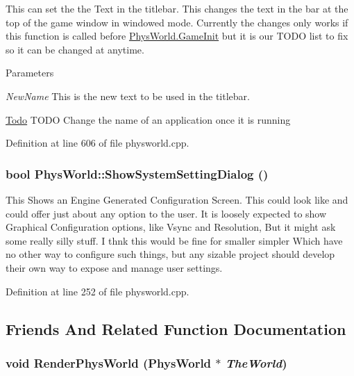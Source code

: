 This can set the the Text in the titlebar. This changes the text in the bar at the top of the game window in windowed mode. Currently the changes only works if this function is called before \hyperlink{classPhysWorld_afc5116f97cc1e91e899d1a1ca7e14e9b}{PhysWorld.GameInit} but it is our TODO list to fix so it can be changed at anytime. 
\begin{DoxyParams}{Parameters}
\item[{\em NewName}]This is the new text to be used in the titlebar. \end{DoxyParams}


\begin{Desc}
\item[\hyperlink{todo__todo000010}{Todo}]TODO Change the name of an application once it is running \end{Desc}


Definition at line 606 of file physworld.cpp.\hypertarget{classPhysWorld_a9b83f04907443c6307956a3c4089e3ca}{
\subsubsection[{ShowSystemSettingDialog}]{\setlength{\rightskip}{0pt plus 5cm}bool PhysWorld::ShowSystemSettingDialog ()}}
\label{db/df5/classPhysWorld_a9b83f04907443c6307956a3c4089e3ca}


This Shows an Engine Generated Configuration Screen. This could look like and could offer just about any option to the user. It is loosely expected to show Graphical Configuration options, like Vsync and Resolution, But it might ask some really silly stuff. I thnk this would be fine for smaller simpler Which have no other way to configure such things, but any sizable project should develop their own way to expose and manage user settings. 

Definition at line 252 of file physworld.cpp.

\subsection{Friends And Related Function Documentation}
\hypertarget{classPhysWorld_a54ca2a75bbccb9b2129f434874f1e693}{
\subsubsection[{RenderPhysWorld}]{\setlength{\rightskip}{0pt plus 5cm}void RenderPhysWorld ({\bf PhysWorld} $\ast$ {\em TheWorld})}}
\label{db/df5/classPhysWorld_a54ca2a75bbccb9b2129f434874f1e693}


